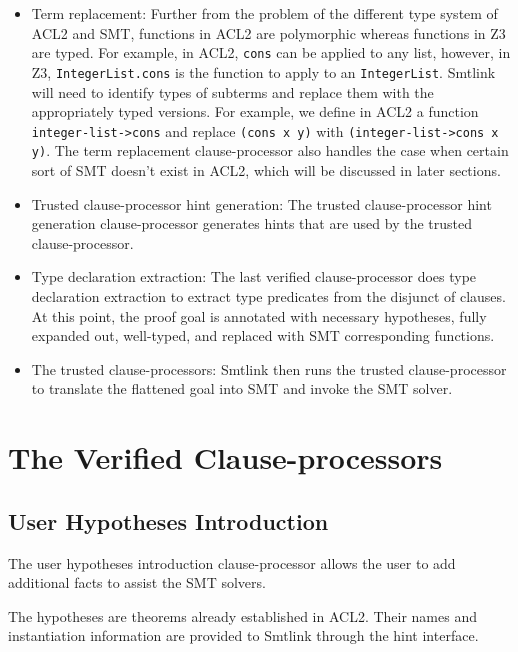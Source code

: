 \begin{itemize}
  \item Term replacement: Further from the problem of the different type system of ACL2 and SMT, functions
    in ACL2 are polymorphic whereas functions in Z3 are typed. For example, in ACL2,
    \texttt{cons} can be applied to any list, however, in Z3,
    \texttt{IntegerList.cons} is the function to apply to an \texttt{IntegerList}.
    Smtlink will need to identify types of subterms and replace them with the
    appropriately typed versions. For example, we define in ACL2 a function
    \texttt{integer-list->cons} and replace \texttt{(cons x y)} with
    \texttt{(integer-list->cons x y)}. The term replacement clause-processor also
    handles the case when certain sort of SMT doesn't exist in ACL2, which will be
    discussed in later sections.

  \item Trusted clause-processor hint generation: The trusted clause-processor hint generation clause-processor generates hints
    that are used by the trusted clause-processor.
  \item Type declaration extraction: The last verified
    clause-processor does type declaration extraction to extract type predicates
    from the disjunct of clauses. At this point, the proof goal is annotated with
    necessary hypotheses, fully expanded out, well-typed, and replaced with SMT
    corresponding functions.
  \item The trusted clause-processors: Smtlink then runs the trusted clause-processor to
    translate the flattened goal into SMT and invoke the SMT solver.
\end{itemize}

\section{The Verified Clause-processors}
\label{sec:vcp}

\subsection{User Hypotheses Introduction}
The user hypotheses introduction clause-processor allows the user to add
additional facts to assist the SMT solvers.

The hypotheses are theorems already established in ACL2. Their names and
instantiation information are provided to Smtlink through the hint interface.

